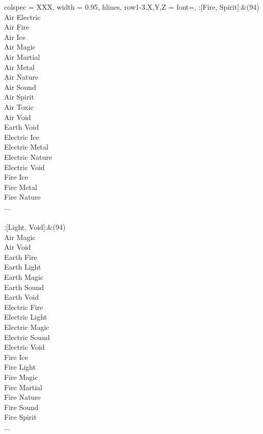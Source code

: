 \begin{longtblr}[
	caption = {2v2 Defending Weak},
	label = {2v2-Defending-Weak},
]{
	colspec = {XXX}, width = 0.95\linewidth,
	hlines,
	row{1-3,X,Y,Z} = {font=\bfseries},
}
	:[Fire, Spirit]:&{(94)\\
	Air Electric \\
	Air Fire \\
	Air Ice \\
	Air Magic \\
	Air Martial \\
	Air Metal \\
	Air Nature \\
	Air Sound \\
	Air Spirit \\
	Air Toxic \\
	Air Void \\
	Earth Void \\
	Electric Ice \\
	Electric Metal \\
	Electric Nature \\
	Electric Void \\
	Fire Ice \\
	Fire Metal \\
	Fire Nature \\
	...\\
	}\\

	:[Light, Void]:&{(94)\\
	Air Magic \\
	Air Void \\
	Earth Fire \\
	Earth Light \\
	Earth Magic \\
	Earth Sound \\
	Earth Void \\
	Electric Fire \\
	Electric Light \\
	Electric Magic \\
	Electric Sound \\
	Electric Void \\
	Fire Ice \\
	Fire Light \\
	Fire Magic \\
	Fire Martial \\
	Fire Nature \\
	Fire Sound \\
	Fire Spirit \\
	...\\
	}\\


\end{longtblr}
